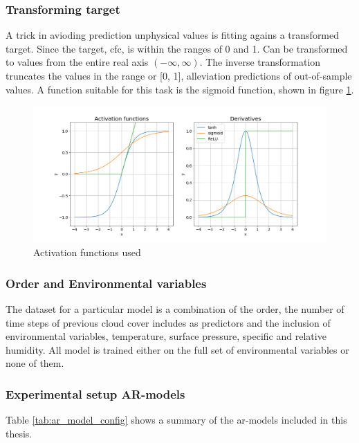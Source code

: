 \subsubsection{Transforming target} \label{sec:transforming_target}
A trick in avioding prediction unphysical values is fitting agains a transformed target. Since the target, \acrfull{cfc}, is within the ranges of 0 and 1. Can be transformed to values from the entire real axis $(-\infty, \infty)$. The inverse transformation truncates the values in the range or [0, 1], alleviation predictions of out-of-sample values. A function suitable for this task is the sigmoid function, shown in figure \ref{fig:activation_func_plus}. 
\begin{figure}
    \centering
    \includegraphics[scale=0.45]{Chapter3_Method/figs/activation_functions_and_derivatives.png}
    \caption{Activation functions used }
    \label{fig:activation_func_plus}
\end{figure}

\subsubsection{Order and Environmental variables}
The dataset for a particular model is a combination of the order, the number of time steps of previous cloud cover includes as predictors and the inclusion of environmental variables, temperature, surface pressure, specific and relative humidity. All model is trained either on the full set of environmental variables or none of them.

\subsubsection{Experimental setup AR-models}
Table \ref{tab:ar_model_config} shows a summary of the \acrshort{ar}-models included in this thesis. 

